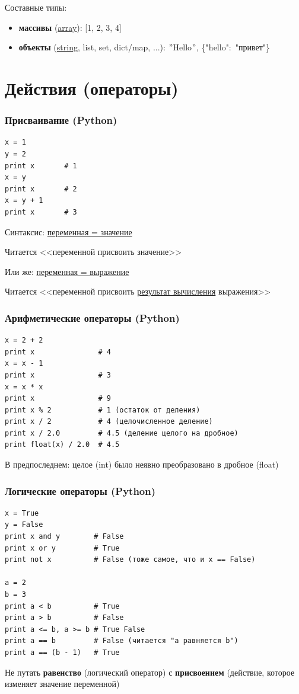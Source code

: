 {{  \vspace{1cm}
  Составные типы:
  \begin{itemize}
    \item \textbf{массивы} (\underline{array}): [1, 2, 3, 4]
    \item \textbf{объекты} (\underline{string}, list, set, dict/map, ...): $"$Hello$"$, \{"hello":~"привет"\}
  \end{itemize}
}

\section{Действия (операторы)}
\begin{frame}[fragile]
  \frametitle{Присваивание (Python)}
  \begin{verbatim}
x = 1
y = 2
print x       # 1
x = y
print x       # 2
x = y + 1
print x       # 3
  \end{verbatim}

  \vspace{0.5cm}
  Синтаксис: \underline{переменная = значение}

  Читается <<переменной присвоить значение>>

  \vspace{0.5cm}
  Или же: \underline{переменная = выражение}

  Читается <<переменной присвоить \underline{результат вычисления} выражения>>
\end{frame}

\begin{frame}[fragile]
  \frametitle{Арифметические операторы (Python)}
  \begin{verbatim}
x = 2 + 2
print x               # 4
x = x - 1
print x               # 3
x = x * x
print x               # 9
print x % 2           # 1 (остаток от деления)
print x / 2           # 4 (целочисленное деление)
print x / 2.0         # 4.5 (деление целого на дробное)
print float(x) / 2.0  # 4.5
  \end{verbatim}
В предпоследнем: целое (int) было неявно преобразовано в дробное (float)
\end{frame}

\begin{frame}[fragile]
  \frametitle{Логические операторы (Python)}
  \begin{verbatim}
x = True
y = False
print x and y        # False
print x or y         # True
print not x          # False (тоже самое, что и x == False)

a = 2
b = 3
print a < b          # True
print a > b          # False
print a <= b, a >= b # True False
print a == b         # False (читается "a равняется b")
print a == (b - 1)   # True
  \end{verbatim}
  Не путать \textbf{равенство} (логический оператор) с \textbf{присвоением} (действие, которое изменяет значение переменной)
\end{frame}

}
